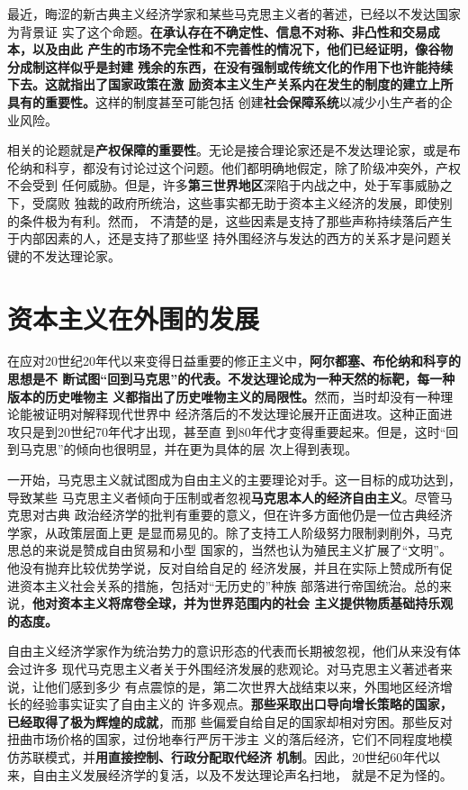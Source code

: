 最近，晦涩的新古典主义经济学家和某些马克思主义者的著述，已经以不发达国家为背景证
实了这个命题。\textbf{在承认存在不确定性、信息不对称、非凸性和交易成本，以及由此
  产生的市场不完全性和不完善性的情况下，他们已经证明，像谷物分成制这样似乎是封建
  残余的东西，在没有强制或传统文化的作用下也许能持续下去。这就指出了国家政策在激
  励资本主义生产关系内在发生的制度的建立上所具有的重要性。}这样的制度甚至可能包括
创建\textbf{社会保障系统}以减少小生产者的企业风险。

相关的论题就是\textbf{产权保障的重要性}。无论是接合理论家还是不发达理论家，或是布
伦纳和科亨，都没有讨论过这个问题。他们都明确地假定，除了阶级冲突外，产权不会受到
任何威胁。但是，许多\textbf{第三世界地区}深陷于内战之中，处于军事威胁之下，受腐败
独裁的政府所统治，这些事实都无助于资本主义经济的发展，即使别的条件极为有利。然而，
不清楚的是，这些因素是支持了那些声称持续落后产生于内部因素的人，还是支持了那些坚
持外围经济与发达的西方的关系才是问题关键的不发达理论家。

\section{资本主义在外围的发展}

在应对20世纪20年代以来变得日益重要的修正主义中，\textbf{阿尔都塞、布伦纳和科亨的思想是不
断试图“回到马克思”的代表。不发达理论成为一种天然的标靶，每一种版本的历史唯物主
义都指出了历史唯物主义的局限性。}然而，当时却没有一种理论能被证明对解释现代世界中
经济落后的不发达理论展开正面进攻。这种正面进攻只是到20世纪70年代才出现，甚至直
到80年代才变得重要起来。但是，这时“回到马克思”的倾向也很明显，并在更为具体的层
次上得到表现。

一开始，马克思主义就试图成为自由主义的主要理论对手。这一目标的成功达到，导致某些
马克思主义者倾向于压制或者忽视\textbf{马克思本人的经济自由主义}。尽管马克思对古典
政治经济学的批判有重要的意义，但在许多方面他仍是一位古典经济学家，从政策层面上更
是显而易见的。除了支持工人阶级努力限制剥削外，马克思总的来说是赞成自由贸易和小型
国家的，当然也认为殖民主义扩展了“文明”。他没有抛弃比较优势学说，反对自给自足的
经济发展，并且在实际上赞成所有促进资本主义社会关系的措施，包括对“无历史的”种族
部落进行帝国统治。总的来说，\textbf{他对资本主义将席卷全球，并为世界范围内的社会
  主义提供物质基础持乐观的态度。}

自由主义经济学家作为统治势力的意识形态的代表而长期被忽视，他们从来没有体会过许多
现代马克思主义者关于外围经济发展的悲观论。对马克思主义著述者来说，让他们感到多少
有点震惊的是，第二次世界大战结束以来，外围地区经济增长的经验事实证实了自由主义的
许多观点。\textbf{那些采取出口导向增长策略的国家，已经取得了极为辉煌的成就}，而那
些偏爱自给自足的国家却相对穷困。那些反对扭曲市场价格的国家，过份地奉行严厉干涉主
义的落后经济，它们不同程度地模仿苏联模式，并\textbf{用直接控制、行政分配取代经济
  机制}。因此，20世纪60年代以来，自由主义发展经济学的复活，以及不发达理论声名扫地，
就是不足为怪的。

